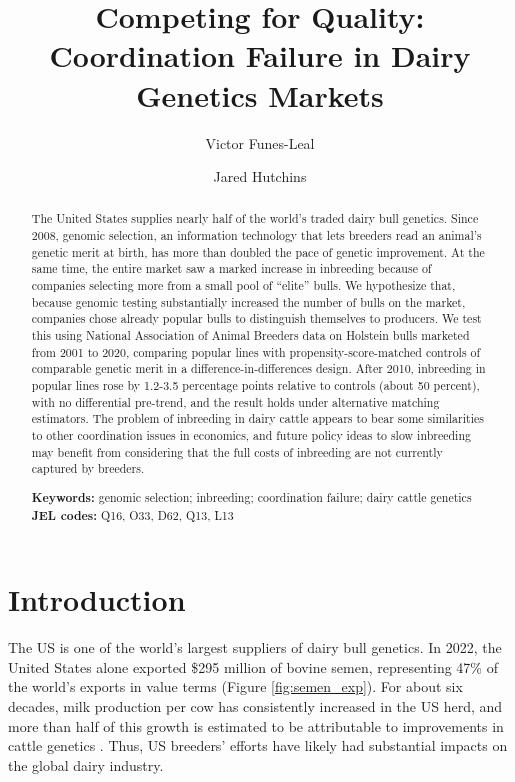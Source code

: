 \documentclass[12pt,letterpaper]{article}
\title{Competing for Quality: Coordination Failure in Dairy Genetics Markets}
\author[1]{Victor Funes-Leal}
\author[2]{Jared Hutchins}
\affil[1]{Department of Agricultural Economics and Agribusiness\\ University of Arkansas}
\affil[2]{Department of Agricultural and Consumer Economics\\ University of Illinois Urbana-Champaign}
\date{} %
\begin{document}
\maketitle



\begin{abstract}
    \noindent\singlespacing
    The United States supplies nearly half of the world's traded dairy bull genetics. Since 2008, genomic selection, an information technology that lets breeders read an animal's genetic merit at birth, has more than doubled the pace of genetic improvement. At the same time, the entire market saw a marked increase in inbreeding because of companies selecting more from a small pool of ``elite'' bulls.
    We hypothesize that, because genomic testing substantially increased the number of bulls on the market, companies chose already popular bulls to distinguish themselves to producers.
    We test this using National Association of Animal Breeders data on Holstein bulls marketed from 2001 to 2020, comparing popular lines with propensity-score-matched controls of comparable genetic merit in a difference-in-differences design. After 2010, inbreeding in popular lines rose by 1.2-3.5 percentage points relative to controls (about 50 percent), with no differential pre-trend, and the result holds under alternative matching estimators. The problem of inbreeding in dairy cattle appears to bear some similarities to other coordination issues in economics, and future policy ideas to slow inbreeding may benefit from considering that the full costs of inbreeding are not currently captured by breeders.

    \vspace{1em}
    \noindent\textbf{Keywords:} genomic selection; inbreeding; coordination failure; dairy cattle genetics
    \noindent\textbf{JEL codes:} Q16, O33, D62, Q13, L13
\end{abstract}

\newpage
\section{Introduction\label{sec:intro}}
The US is one of the world's largest suppliers of dairy bull genetics.
In 2022, the United States alone exported \$295 million of bovine semen, representing 47\% of the world's exports in value terms (Figure \ref{fig:semen_exp}). For about six decades, milk production per cow has consistently increased in the US herd, and more than half of this growth is estimated to be attributable to improvements in cattle genetics \citep{cdcbimpact}. Thus, US breeders' efforts have likely had substantial impacts on the global dairy industry.
\end{document}
